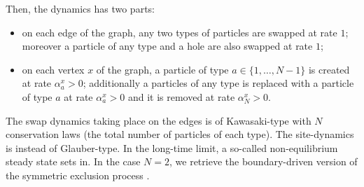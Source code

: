 \documentclass[10pt]{article}
\numberwithin{equation}{section}
\numberwithin{equation}{subsection}
\newtheorem{remark}{Remark}
\begin{document}
Then, the dynamics has two parts: 
\begin{itemize}
\item
on each edge of the graph, any two types of particles are swapped at rate $1$;
moreover a particle of any type and a hole are also swapped at rate $1$;
\item
on each vertex $x$ of the graph, a particle of type $a \in \{1,\ldots,N-1\}$ is created  at rate $\alpha_a^x >0$;
additionally a particles of any type is replaced with a
particle of type $a$ at rate $\alpha_a^x >0$ and it is removed at rate $\alpha_N^x >0$.
\end{itemize}
The swap dynamics taking place on the edges is of Kawasaki-type 
with $N$ conservation laws
(the total number of particles of each type). 
The site-dynamics is instead of Glauber-type. 
In the long-time limit, a so-called non-equilibrium
steady state sets in.
In the case $N=2$, we retrieve the  boundary-driven version of the symmetric exclusion process \cite{schutzSandow,carinci2013duality}.
%
%
\end{document}
